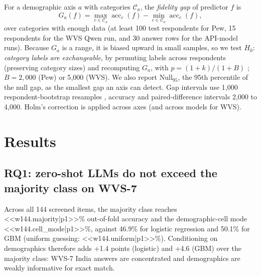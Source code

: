 \documentclass[conference]{IEEEtran}
\begin{document}
For a demographic axis $a$ with categories $\mathcal{C}_a$, the \emph{fidelity gap} of predictor $f$ is
\begin{equation}
G_a(f)=\max_{c\in\mathcal{C}_a}\operatorname{acc}_c(f)-\min_{c\in\mathcal{C}_a}\operatorname{acc}_c(f),
\end{equation}
over categories with enough data (at least 100 test respondents for Pew, 15 respondents for the WVS Qwen run, and 30 answer rows for the API-model runs). Because $G_a$ is a range, it is biased upward in small samples, so we test $H_0$: \emph{category labels are exchangeable}, by permuting labels across respondents (preserving category sizes) and recomputing $G_a$, with $p=(1+k)/(1+B)$ \cite{phipson2010}; $B=2{,}000$ (Pew) or 5{,}000 (WVS). We also report $\mathrm{Null}_{95}$, the 95th percentile of the null gap, as the smallest gap an axis can detect. Gap intervals use 1{,}000 respondent-bootstrap resamples \cite{efron1993}, accuracy and paired-difference intervals 2{,}000 to 4{,}000. Holm's correction \cite{holm1979} is applied across axes (and across models for WVS).

\section{Results}

\subsection{RQ1: zero-shot LLMs do not exceed the majority class on WVS-7}

\begin{table}[!t]
\caption{WVS-7: LLM accuracy (\%, 95\% respondent-bootstrap CI) and each baseline's accuracy on the same rows, with the paired difference LLM $-$ baseline [95\% CI] (points). API models use 30 and 40 respondents; the local Qwen run uses a larger random sample.}
\label{tab:wvs}
\centering
\footnotesize

\end{table}

Across all 144 screened items, the majority class reaches <<w144.majority|p1>>\% out-of-fold accuracy and the demographic-cell mode <<w144.cell_mode|p1>>\%, against 46.9\% for logistic regression and 50.1\% for GBM (uniform guessing: <<w144.uniform|p1>>\%). Conditioning on demographics therefore adds +1.4 points (logistic) and +4.6 (GBM) over the majority class: WVS-7 India answers are concentrated and demographics are weakly informative for exact match.
\end{document}
